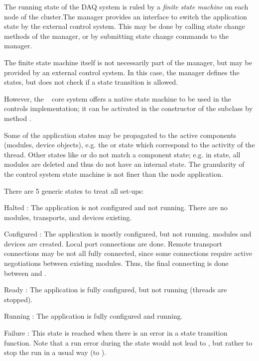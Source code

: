 The running state of the DAQ system is ruled by a {\sl finite state machine} on 
each node of the cluster.The manager provides an interface to switch the application 
	 state by the external control system. This may be done by calling 
	 state change methods of the manager, or by submitting state change commands 
      to the manager.

The finite state machine itself is not necessarily part of the manager,
but may be provided by an external control system. In this case,
the manager defines the states, but does not check if a state transition is allowed. 

However, the \dabc~ core system offers a native state machine to be used
in the controls implementation; it can be
activated in the constructor of the  subclass 
by method .      
      
Some of the application states may be propagated to the 
      active components (modules, device objects), e.g. the 
       or  state which correspond to the activity of the thread. 
      Other states like  or  do not match a component state; 
      e.g. in  state, all modules are deleted and thus do not 
      have an internal state. The granularity of the control system state 
      machine is not finer than the node application.

There are 5 generic states to treat all set-ups: 
\begin{compactdesc}
\item[Halted] : The application is not configured and not running. 
	 There are no modules, transports, and devices existing.
\item[Configured] : The application is mostly configured, but not running. 
	 modules and devices are created. Local port connections are done.
	  Remote transport connections may be not all fully connected, 
	  since some connections require active negotiations between existing 
	  modules. Thus, the final connecting is done between 
	   and .  
\item[Ready] : The application is fully configured, but not running 
	 (threads are stopped).
\item[Running] : The application is fully configured and running.
\item[Failure] : This state is reached when there is an error in a 
	 state transition function. Note that a run error during the 
	  state would not lead to , but rather to stop 
	 the run in a usual way (to ).
\end{compactdesc}

